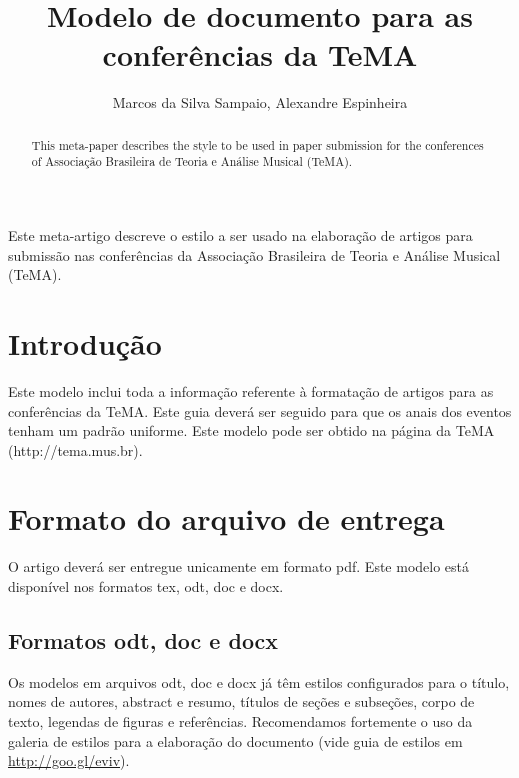 \documentclass[12pt]{article}
\title{Modelo de documento para as conferências da TeMA}
\author{Marcos da Silva Sampaio\inst{1}, Alexandre Espinheira\inst{1}}
\begin{document}
\maketitle

\begin{abstract}
  This meta-paper describes the style to be used in paper submission
  for the conferences of Associação Brasileira de Teoria e Análise
  Musical (TeMA).
\end{abstract}


\begin{resumo}
  Este meta-artigo descreve o estilo a ser usado na elaboração de
  artigos para submissão nas conferências da Associação Brasileira de
  Teoria e Análise Musical (TeMA).
\end{resumo}


\section{Introdução}
\label{sec:gen}

Este modelo inclui toda a informação referente à formatação de artigos
para as conferências da TeMA. Este guia deverá ser seguido para que os
anais dos eventos tenham um padrão uniforme. Este modelo pode ser
obtido na página da TeMA (http://tema.mus.br).

\section{Formato do arquivo de entrega}
\label{sec:formato-arquivo}

O artigo deverá ser entregue unicamente em formato pdf. Este modelo
está disponível nos formatos tex, odt, doc e docx.

\subsection{Formatos odt, doc e docx}
\label{sec:formatos-odt-doc}

Os modelos em arquivos odt, doc e docx já têm estilos configurados
para o título, nomes de autores, abstract e resumo, títulos de seções
e subseções, corpo de texto, legendas de figuras e referências.
Recomendamos fortemente o uso da galeria de estilos para a elaboração
do documento (vide guia de estilos em \url{http://goo.gl/eviv}).
\end{document}
